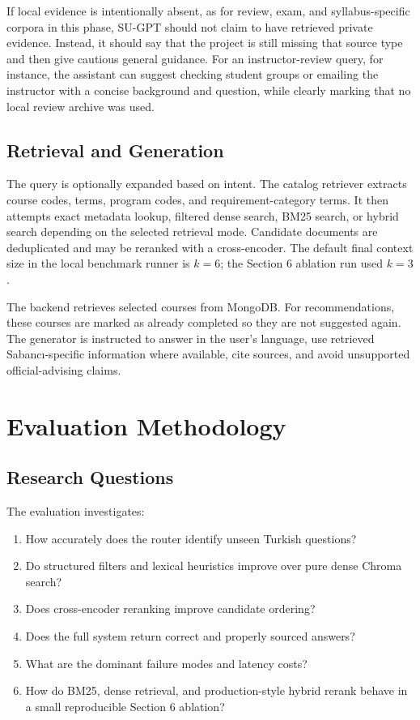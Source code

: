 \documentclass[10pt,a4paper]{article}
\begin{document}
If local evidence is intentionally absent, as for review, exam, and syllabus-specific corpora in this phase, SU-GPT should not claim to have retrieved private evidence. Instead, it should say that the project is still missing that source type and then give cautious general guidance. For an instructor-review query, for instance, the assistant can suggest checking student groups or emailing the instructor with a concise background and question, while clearly marking that no local review archive was used.

\subsection{Retrieval and Generation}

The query is optionally expanded based on intent. The catalog retriever extracts course codes, terms, program codes, and requirement-category terms. It then attempts exact metadata lookup, filtered dense search, BM25 search, or hybrid search depending on the selected retrieval mode. Candidate documents are deduplicated and may be reranked with a cross-encoder. The default final context size in the local benchmark runner is $k=6$; the Section 6 ablation run used $k=3$.

The backend retrieves selected courses from MongoDB. For recommendations, these courses are marked as already completed so they are not suggested again. The generator is instructed to answer in the user's language, use retrieved Sabancı-specific information where available, cite sources, and avoid unsupported official-advising claims.



\section{Evaluation Methodology}

\subsection{Research Questions}

The evaluation investigates:
\begin{enumerate}
    \item How accurately does the router identify unseen Turkish questions?
    \item Do structured filters and lexical heuristics improve over pure dense Chroma search?
    \item Does cross-encoder reranking improve candidate ordering?
    \item Does the full system return correct and properly sourced answers?
    \item What are the dominant failure modes and latency costs?
    \item How do BM25, dense retrieval, and production-style hybrid rerank behave in a small reproducible Section 6 ablation?
\end{enumerate}
\end{document}
